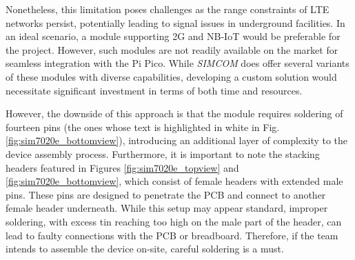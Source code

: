 Nonetheless, this limitation poses challenges as the range constraints of LTE networks persist, potentially leading to 
signal issues in underground facilities. In an ideal scenario, a module supporting 2G and NB-IoT would be preferable for 
the project. However, such modules are not readily available on the market for seamless integration with the Pi Pico. While 
\textit{SIMCOM} does offer several variants of these modules with diverse capabilities, developing a custom solution would 
necessitate significant investment in terms of both time and resources.

However, the downside of this approach is that the module requires soldering of fourteen pins (the ones whose text is highlighted in white in Fig. \ref{fig:sim7020e_bottomview}), introducing an additional layer of complexity to the device assembly process. Furthermore, it is important to note the stacking headers featured in Figures \ref{fig:sim7020e_topview} and \ref{fig:sim7020e_bottomview}, which consist of female headers with extended male pins. These pins are designed to penetrate the PCB and connect to another female header underneath. While this setup may appear standard, improper soldering, with excess tin reaching too high on the male part of the header, can lead to faulty connections with the PCB or breadboard. Therefore, if the team intends to assemble the device on-site, careful soldering is a must.


